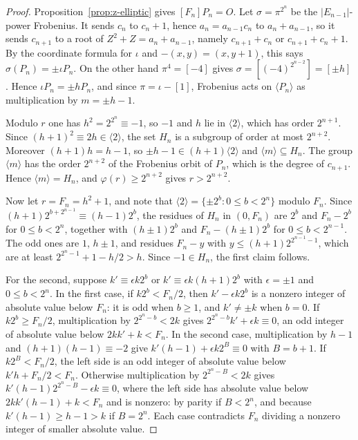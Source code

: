 \documentclass[11pt]{article}
\theoremstyle{definition}
\theoremstyle{remark}
\begin{document}
\begin{proof}
Proposition~\ref{prop:z-elliptic} gives $[F_n]P_n=O$.  Let
$\sigma=\pi^{2^n}$ be the $|E_{n-1}|$-power Frobenius.  It sends $c_n$ to
$c_n+1$, hence $a_n=a_{n-1}c_n$ to $a_n+a_{n-1}$, so it sends $c_{n+1}$ to a
root of $Z^2+Z=a_n+a_{n-1}$, namely $c_{n+1}+c_n$ or $c_{n+1}+c_n+1$.  By the
coordinate formula for $\iota$ and $-(x,y)=(x,y+1)$, this says
$\sigma(P_n)=\pm\iota P_n$.  On the other hand $\pi^4=[-4]$ gives
$\sigma=[(-4)^{2^{n-2}}]=[\pm h]$.  Hence $\iota P_n=\pm hP_n$, and since
$\pi=\iota-[1]$, Frobenius acts on $\langle P_n\rangle$ as multiplication by
$m=\pm h-1$.

Modulo $r$ one has $h^2=2^{2^n}\equiv-1$, so $-1$ and $h$ lie in
$\langle2\rangle$, which has order $2^{n+1}$.  Since
$(h+1)^2\equiv2h\in\langle2\rangle$, the set $H_n$ is a subgroup of order
at most $2^{n+2}$.  Moreover $(h+1)h=h-1$, so $\pm h-1\in(h+1)\langle2\rangle$
and $\langle m\rangle\subseteq H_n$.  The group $\langle m\rangle$ has the
order $2^{n+2}$ of the Frobenius orbit of $P_n$, which is the degree of
$c_{n+1}$.  Hence $\langle m\rangle=H_n$, and $\varphi(r)\geq2^{n+2}$ gives
$r>2^{n+2}$.

Now let $r=F_n=h^2+1$, and note that
$\langle2\rangle=\{\pm2^b:0\leq b<2^n\}$ modulo $F_n$.  Since
$(h+1)2^{b+2^{n-1}}\equiv(h-1)2^b$, the residues of $H_n$ in $(0,F_n)$ are
$2^b$ and $F_n-2^b$ for $0\leq b<2^n$, together with $(h\pm1)2^b$ and
$F_n-(h\pm1)2^b$ for $0\leq b<2^{n-1}$.  The odd ones are $1$, $h\pm1$, and
residues $F_n-y$ with $y\leq(h+1)2^{2^{n-1}-1}$, which are at least
$2^{2^n-1}+1-h/2>h$.  Since $-1\in H_n$, the first claim follows.

For the second, suppose $k'\equiv\epsilon k2^b$ or
$k'\equiv\epsilon k(h+1)2^b$ with $\epsilon=\pm1$ and $0\leq b<2^n$.  In the
first case, if $k2^b<F_n/2$, then $k'-\epsilon k2^b$ is a nonzero integer of
absolute value below $F_n$: it is odd when $b\geq1$, and $k'\ne\pm k$ when
$b=0$.  If $k2^b\geq F_n/2$, multiplication by $2^{2^n-b}<2k$ gives
$2^{2^n-b}k'+\epsilon k\equiv0$, an odd integer of absolute value below
$2kk'+k<F_n$.  In the second case, multiplication by $h-1$ and
$(h+1)(h-1)\equiv-2$ give $k'(h-1)+\epsilon k2^{B}\equiv0$ with $B=b+1$.  If
$k2^B<F_n/2$, the left side is an odd integer of absolute value below
$k'h+F_n/2<F_n$.  Otherwise multiplication by $2^{2^n-B}<2k$ gives
$k'(h-1)2^{2^n-B}-\epsilon k\equiv0$, where the left side has absolute value
below $2kk'(h-1)+k<F_n$ and is nonzero: by parity if $B<2^n$, and because
$k'(h-1)\geq h-1>k$ if $B=2^n$.  Each case contradicts $F_n$ dividing a
nonzero integer of smaller absolute value.
\end{proof}
\end{document}
